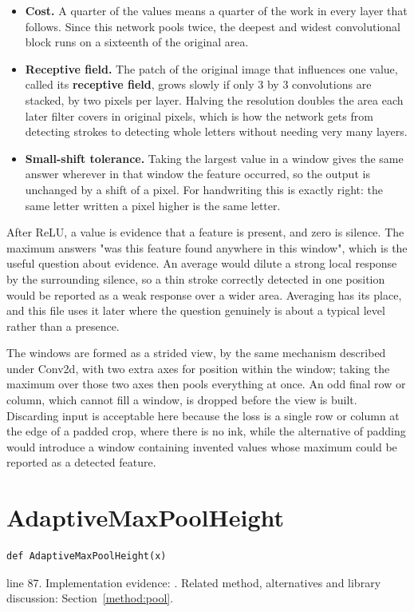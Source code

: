 \begin{itemize}\setlength\itemsep{0pt}
  \item \textbf{Cost.} A quarter of the values means a quarter of the work in every layer that follows. Since this network pools twice, the deepest and widest convolutional block runs on a sixteenth of the original area.
  \item \textbf{Receptive field.} The patch of the original image that influences one value, called its \textbf{receptive field}, grows slowly if only 3 by 3 convolutions are stacked, by two pixels per layer. Halving the resolution doubles the area each later filter covers in original pixels, which is how the network gets from detecting strokes to detecting whole letters without needing very many layers.
  \item \textbf{Small-shift tolerance.} Taking the largest value in a window gives the same answer wherever in that window the feature occurred, so the output is unchanged by a shift of a pixel. For handwriting this is exactly right: the same letter written a pixel higher is the same letter.
\end{itemize}

After ReLU, a value is evidence that a feature is present, and zero is silence. The maximum answers "was this feature found anywhere in this window", which is the useful question about evidence. An average would dilute a strong local response by the surrounding silence, so a thin stroke correctly detected in one position would be reported as a weak response over a wider area. Averaging has its place, and this file uses it later where the question genuinely is about a typical level rather than a presence.


The windows are formed as a strided view, by the same mechanism described under Conv2d, with two extra axes for position within the window; taking the maximum over those two axes then pools everything at once. An odd final row or column, which cannot fill a window, is dropped before the view is built. Discarding input is acceptable here because the loss is a single row or column at the edge of a padded crop, where there is no ink, while the alternative of padding would introduce a window containing invented values whose maximum could be reported as a detected feature.



\section{AdaptiveMaxPoolHeight}\label{fn:recognise:AdaptiveMaxPoolHeight}
\begin{lstlisting}[style=sig]
def AdaptiveMaxPoolHeight(x)
\end{lstlisting}
 line 87. Implementation evidence: \cite{code2026}. Related method, alternatives and library discussion: Section~\ref{method:pool}.


